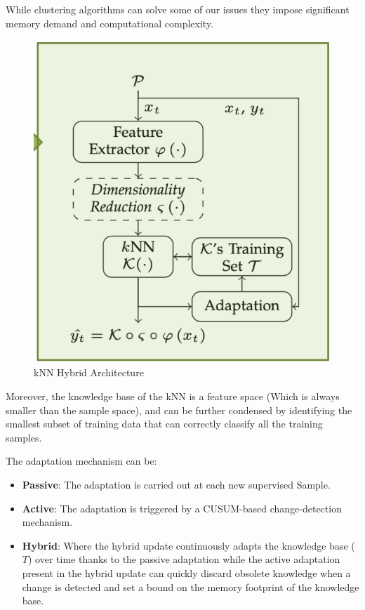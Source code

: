 \documentclass{article}
\begin{document}
      While clustering algorithms can solve some of our issues they impose significant memory demand and computational complexity.
      \begin{figure}[H]
        \includegraphics[scale=0.35]{../Images/kNNArch.png}
        \centering
        \caption{kNN Hybrid Architecture}
      \end{figure}

      Moreover, the knowledge base of the kNN is a feature space (Which is always smaller than the sample space), and can be further condensed by identifying the smallest subset of training data that can correctly classify all the training samples.

      The adaptation mechanism can be:
      \begin{itemize}
        \item \textbf{Passive}: The adaptation is carried out at each new supervised Sample.
        \item \textbf{Active}: The adaptation is triggered by a CUSUM-based change-detection mechanism.
        \item \textbf{Hybrid}: Where the hybrid update continuously adapts the knowledge base ($T$) over time thanks to the passive adaptation while the active adaptation present in the hybrid
        update can quickly discard obsolete knowledge when a change is detected and set a bound on the memory footprint of the knowledge base.
      \end{itemize}
\end{document}
